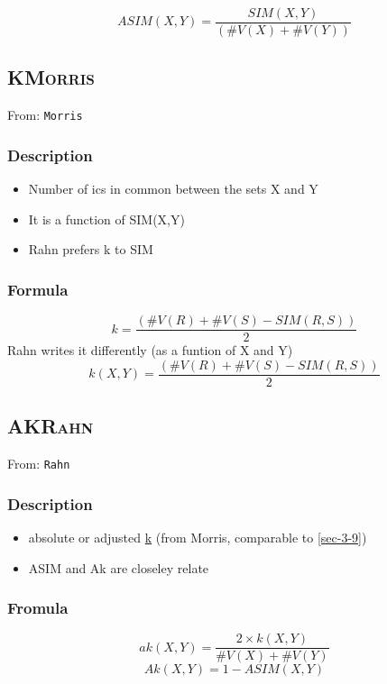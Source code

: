 \documentclass[11pt]{article}
\begin{document}
$$ ASIM \left ( X, Y \right ) = \frac{SIM \left ( X, Y \right )}{\left ( \# V \left (X \right ) + \# V \left (Y \right ) \right )} $$

\subsection{K\hfill{}\textsc{Morris}}
\label{sec-3-10}
From: \texttt{Morris}
\subsubsection{Description}
\label{sec-3-10-1}

\begin{itemize}
\item Number of ics in common between the sets X and Y
\item It is a function of SIM(X,Y)
\item Rahn prefers k to SIM
\end{itemize}
\subsubsection{Formula}
\label{sec-3-10-2}

$$ k = \frac{\left( \# V  \left( R \right) + \# V  \left( S \right) - SIM  \left( R, S \right) \right)}{2} $$
Rahn writes it differently (as a funtion of X and Y)
$$ k\left(X, Y \right) = \frac{\left( \# V  \left( R \right) + \# V  \left( S \right) - SIM  \left( R, S \right) \right)}{2} $$

\subsection{AK\hfill{}\textsc{Rahn}}
\label{sec-3-11}
From: \texttt{Rahn}
\subsubsection{Description}
\label{sec-3-11-1}
\begin{itemize}
\item absolute or adjusted \hyperref[sec-3-10]{k} (from Morris, comparable to \ref{sec-3-9})
\item ASIM and Ak are closeley relate
\end{itemize}

\subsubsection{Fromula}
\label{sec-3-11-2}
$$ ak \left( X, Y \right) = \frac{2 \times k \left( X, Y \right)}{\# V \left( X \right) + \# V \left( Y \right) }  $$
$$ Ak(X,Y)=1-ASIM(X,Y) $$
\end{document}
